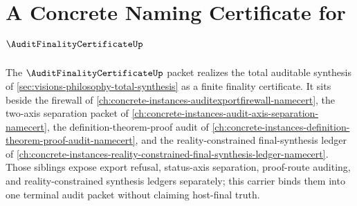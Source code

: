 \chapter{A Concrete Naming Certificate for $\AuditFinalityCertificateUp$}
\label{ch:concrete-instances-auditfinalitycertificate-namecert}

The $\AuditFinalityCertificateUp$ packet realizes the total auditable synthesis of \autoref{sec:visions-philosophy-total-synthesis} as a finite finality certificate. It sits beside the firewall of \autoref{ch:concrete-instances-auditexportfirewall-namecert}, the two-axis separation packet of \autoref{ch:concrete-instances-audit-axis-separation-namecert}, the definition-theorem-proof audit of \autoref{ch:concrete-instances-definition-theorem-proof-audit-namecert}, and the reality-constrained final-synthesis ledger of \autoref{ch:concrete-instances-reality-constrained-final-synthesis-ledger-namecert}. Those siblings expose export refusal, status-axis separation, proof-route auditing, and reality-constrained synthesis ledgers separately; this carrier binds them into one terminal audit packet without claiming host-final truth.

